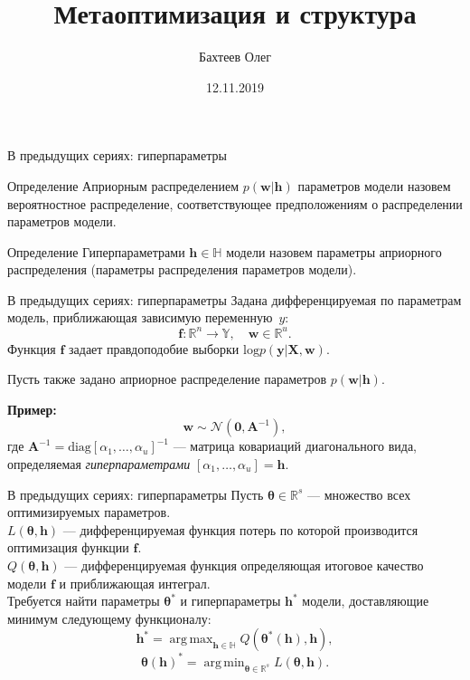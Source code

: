 \documentclass[10pt,pdf,utf8,russian,aspectratio=169]{beamer}
\title[Метаоптимизация и выбор структуры]{Метаоптимизация и структура}
\author{Бахтеев Олег}
\institute{МФТИ}
\date{12.11.2019}
\DeclareMathOperator*{\argmin}{arg\,min}
\DeclareMathOperator*{\argmax}{arg\,max}
\begin{document}

\begin{frame}
  \titlepage
\end{frame}

\begin{frame}{В предыдущих сериях: гиперпараметры}
\begin{block}{Определение}
Априорным распределением $p(\mathbf{w}|\mathbf{h})$ параметров модели назовем вероятностное распределение, соответствующее предположениям о
распределении параметров модели.
\end{block}

\begin{block}{Определение}
Гиперпараметрами $\mathbf{h} \in \mathbb{H}$ модели назовем параметры априорного распределения (параметры распределения параметров модели).
\end{block}

\end{frame}



\begin{frame}{В предыдущих сериях: гиперпараметры}
Задана дифференцируемая по параметрам модель, приближающая зависимую переменную~$y$:
\[
	\mathbf{f}:\mathbb{R}^n \to \mathbb{Y}, \quad \mathbf{w} \in \mathbb{R}^u.
\]
Функция $\mathbf{f}$ задает правдоподобие выборки $\text{log}p(\mathbf{y}|\mathbf{X}, \mathbf{w})$. 

Пусть также задано априорное распределение параметров $p(\mathbf{w}|\mathbf{h})$.
\vspace{1cm}

\textbf{Пример:}
 $$\mathbf{w} \sim \mathcal{N}(\mathbf{0}, \mathbf{A}^{-1}),$$
где $\mathbf{A}^{-1} = \text{diag}[\alpha_1, \dots, \alpha_u]^{-1}$ --- матрица ковариаций диагонального вида, определяемая \textit{гиперпараметрами} $[\alpha_1, \dots, \alpha_u] = \mathbf{h}$. 
\end{frame}

\begin{frame}{В предыдущих сериях: гиперпараметры}
Пусть $\boldsymbol{\theta} \in \mathbb{R}^s$ --- множество всех оптимизируемых параметров.\\
$L(\boldsymbol{\theta},\mathbf{h})$ ---  дифференцируемая функция потерь  по которой производится оптимизация функции $\mathbf{f}$. \\
$Q(\boldsymbol{\theta},\mathbf{h})$ ---  дифференцируемая функция определяющая итоговое качество модели $\mathbf{f}$ и приближающая интеграл.\\

Требуется найти параметры ${\boldsymbol{\theta}}^{*}$ и гиперпараметры ${\mathbf{h}}^{*}$ модели, доставляющие минимум следующему функционалу:
\[
{\mathbf{h}}^{*} = \argmax_{\mathbf{h} \in \mathbb{H}} Q({\boldsymbol{\theta}^{*}}(\mathbf{h}), \mathbf{h}),
\]
\[
	{\boldsymbol{\theta}}(\mathbf{h})^{*} =  \argmin_{\boldsymbol{\theta} \in \mathbb{R}^s} L(\boldsymbol{\theta}, \mathbf{h}).
\]
\end{frame}
\end{document}
